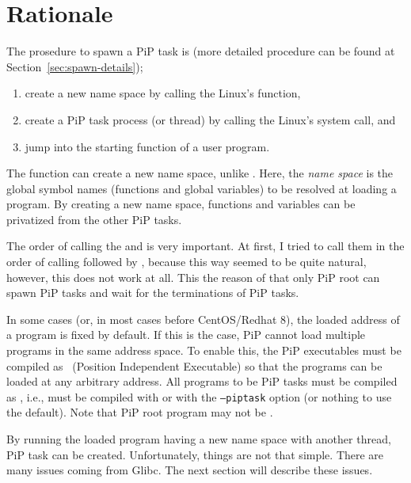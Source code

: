 
\section{Rationale}\label{sec:rationale}

The prosedure to spawn a PiP task is (more detailed procedure can be
found at Section~\ref{sec:spawn-details});

\begin{enumerate}
\item create a new name space by calling the Linux's  function,
\item create a PiP task process (or thread) by calling the Linux's
   system call, and 
\item jump into the starting function of a user program.
\end{enumerate}

The  function can create a new name space, unlike
. Here, the {\it name space} is the global symbol
names (functions and global variables) to be resolved at loading a
program. By creating a new name space, functions and variables can be
privatized from the other PiP tasks. 

The order of calling the  and 
is very important.  At first, I tried to call them in the order of
calling  followed by , because
this way seemed to be 
quite natural, however, this does not work at all. This the reason of
that only PiP root can spawn PiP tasks and wait for the terminations
of PiP tasks. 

In some cases (or, in most cases before CentOS/Redhat 8), the loaded
address of a program is fixed by default. If this is the case, PiP
cannot load multiple programs in the same address space. To enable
this, the PiP executables must be compiled as \PIE\ (Position
Independent Executable) so that the programs can be loaded at any
arbitrary address. All programs to be PiP tasks must be compiled as
\PIE, i.e., must be compiled with  or 
with the {\tt --piptask} option (or nothing to use the default). Note
that PiP root program may not be \PIE.  

By running the loaded program having a new name space with another
thread, PiP task can be created. Unfortunately, things are not that
simple. There are many issues coming from Glibc. The next section will
describe these issues. 
